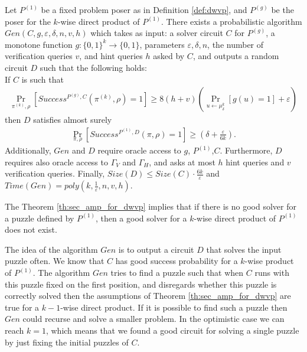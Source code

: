 \begin{theorem}
\label{th:sec_amp_for_dwvp}
Let $P^{(1)}$ be a fixed problem poser as in Definition \ref{def:dwvp}, and $P^{(g)}$ be the poser for the $k$-wise direct product of $P^{(1)}$.
There exists a probabilistic algorithm $Gen(C, g, \varepsilon, \delta, n, v, h)$ which takes as input: a solver circuit $C$ for $P^{(g)}$,
a monotone function $g:\{0,1\}^k \rightarrow \{0,1\}$, parameters $\varepsilon, \delta,n$,
the number of verification queries $v$, and hint queries $h$ asked by $C$, and outputs a random circuit $D$
such that the following holds: \\
If $C$ is such that \\
  \begin{align*}
    \underset{\pi^{(k)}, \rho}{\Pr}\left[Success^{P^{(g)}, C}(\pi^{(k)}, \rho) = 1\right] \geq 8(h+v)\left(\underset{u \leftarrow \mu_\delta^k}{\Pr}\left[g(u) = 1\right] + \varepsilon\right)
  \end{align*}
then $D$ satisfies almost surely
  \begin{align*}
    \underset{\pi, \rho}{\Pr}\left[Success^{P^{(1)},D}(\pi, \rho) = 1\right] \geq (\delta + \frac{\varepsilon}{6k}).
  \end{align*}
Additionally, $Gen$ and $D$ require oracle access to $g$, $P^{(1)}$,$C$.
Furthermore, $D$ requires also oracle access to $\Gamma_V$ and $\Gamma_H$,
and asks at most $h$ hint queries and $v$ verification queries.
Finally, $Size(D) \leq Size(C) \cdot \frac{6k}{\varepsilon}$ and $Time(Gen) = poly(k, \frac{1}{\varepsilon}, n, v, h)$.
\end{theorem}
%
The Theorem \ref{th:sec_amp_for_dwvp} implies that if there is no good solver for a puzzle defined by $P^{(1)}$, then a good solver for
a $k$-wise direct product of $P^{(1)}$ does not exist.


The idea of the algorithm $Gen$ is to output a circuit $D$ that solves the input puzzle often.
We know that $C$ has good success probability for a $k$-wise product of $P^{(1)}$.
The algorithm $Gen$ tries to find a puzzle such that when $C$ runs with this puzzle fixed
on the first position, and disregards whether this puzzle is correctly solved
then the assumptions of Theorem \ref{th:sec_amp_for_dwvp} are true for a $k-1$-wise direct product.
If it is possible to find such a puzzle then $Gen$ could recurse and solve a smaller problem.
In the optimistic case we can reach $k=1$, which means that we found a good circuit for solving a single
puzzle by just fixing the initial puzzles of $C$.

